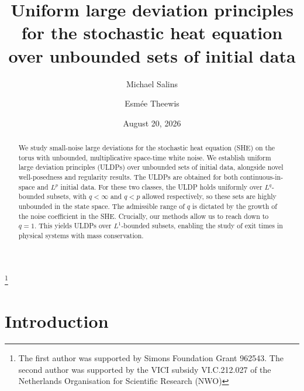 \documentclass{amsart}
\theoremstyle{plain}
\theoremstyle{remark}
\theoremstyle{plain}
\numberwithin{equation}{section}
\begin{document}
\author{Michael Salins}
\address[Michael Salins]{Boston University\\United States of America.} 
\author{Esm\'ee Theewis}
\address[Esm\'ee Theewis]{Delft University of Technology\\The Netherlands.}

\thanks{The first author was supported by Simons Foundation Grant 962543. The second author was supported by the VICI subsidy VI.C.212.027 of the Netherlands Organisation for Scientific Research (NWO)}   

\date{August 20, 2026}
 
\title[ULDP  for the stochastic heat equation]{Uniform large deviation principles for the stochastic heat equation  
over unbounded sets of initial data}





\begin{abstract}
We study small-noise large deviations for the stochastic heat equation (SHE) on the torus with unbounded, multiplicative space-time white noise. We establish uniform large deviation principles (ULDPs) over unbounded sets of initial data, alongside novel well-posedness and regularity results.  
The ULDPs are obtained for both  continuous-in-space  and  $L^p$ initial data. 
For these two classes, the ULDP holds uniformly over $L^q$-bounded subsets, with  $q<\infty$ and $q<p$ allowed respectively, so these sets  are highly unbounded in the state space. 
The admissible range of $q$ is dictated by the growth of the noise coefficient in the SHE. 
Crucially, our methods allow us to reach down to $q=1$. This yields ULDPs over $L^1$-bounded subsets, enabling the study of exit times in physical systems with mass conservation. 
\end{abstract} 




\maketitle 


\section*{Introduction}
 
\end{document}
